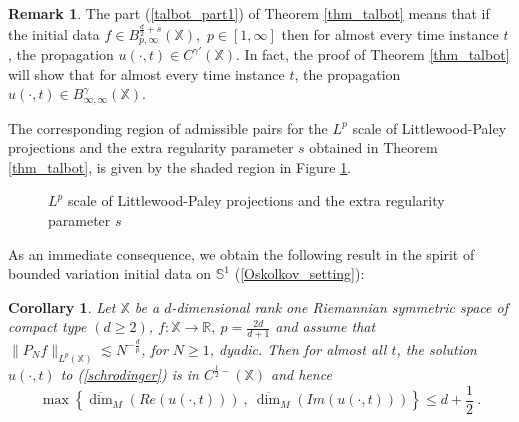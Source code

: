\documentclass[12pt]{amsart}
\newtheorem{corollary}[theorem]{Corollary}
\theoremstyle{definition}
\newtheorem{remark}[theorem]{Remark}
\newcommand{\R}{\mathbb R}%
\newcommand{\Sb}{\mathbb S}%
\newcommand{\X}{\mathbb X}%
\numberwithin{equation}{section}
\begin{document}
\begin{remark} \label{smoothing_effect}
The part (\ref{talbot_part1}) of Theorem \ref{thm_talbot} means that if the initial data $f \in B^{\frac{d}{2}+s}_{p,\infty}(\X),$ $p \in [1,\infty]$ then for almost every time instance $t$, the propagation $u(\cdot,t) \in C^{\gamma'}(\X)$. In fact, the proof of Theorem \ref{thm_talbot} will show that for almost every time instance $t$, the propagation $u(\cdot,t) \in B^{\gamma}_{\infty,\infty}(\X)$.
\end{remark}

The corresponding region of admissible pairs for the $L^p$ scale of Littlewood-Paley projections and the extra regularity parameter $s$ obtained in Theorem \ref{thm_talbot}, is given by the shaded region in Figure \ref{figure}.
\begin{figure}[h]
\begin{center}
\end{center}
\caption{$L^p$ scale of Littlewood-Paley projections and the extra regularity parameter $s$}
\label{figure}
\end{figure}

As an immediate consequence, we obtain the following result in the spirit of bounded variation initial data on $\Sb^1$ (\ref{Oskolkov_setting}):
\begin{corollary} \label{talbot_corollary}
Let $\X$ be a $d$-dimensional rank one Riemannian symmetric space of compact type $(d \ge 2)$, $f:\X \to \R,\:p=\frac{2d}{d+1}$ and assume that  $\|P_Nf\|_{L^p(\X)} \lesssim N^{-\frac{d}{p}}$, for $N\ge 1$, dyadic. Then for almost all $t$, the solution $u(\cdot,t)$ to (\ref{schrodinger}) is in $C^{\frac{1}{2}-}\left(\X\right)$ and hence 
\begin{equation*}
\max\left\{\overline{\dim}_M\left(Re\left(u(\cdot,t)\right)\right)\:,\:\overline{\dim}_M\left(Im\left(u(\cdot,t)\right)\right)\right\} \le d+\frac{1}{2}\:.
\end{equation*}
\end{corollary}
\end{document}
